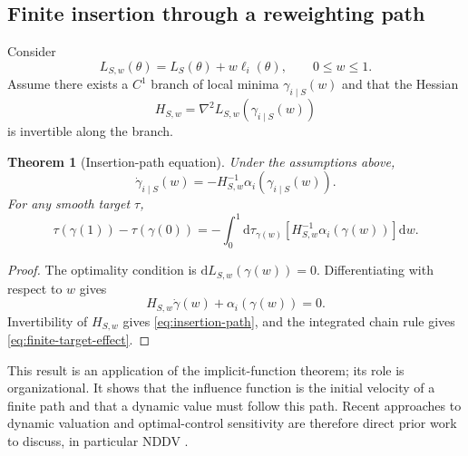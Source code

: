 \documentclass[10pt,a4paper]{article}
\newtheorem{theorem}{Theorem}[section]
\newcommand{\dd}{\mathrm d}
\begin{document}
\subsection{Finite insertion through a reweighting path}
Consider
\begin{equation}
L_{S,w}(\theta)=L_S(\theta)+w\ell_i(\theta),
\qquad 0\leq w\leq1.
\end{equation}
Assume there exists a $C^1$ branch of local minima $\gamma_{i\mid S}(w)$ and that the Hessian
\[
H_{S,w}=\nabla^2L_{S,w}(\gamma_{i\mid S}(w))
\]
is invertible along the branch.

\begin{theorem}[Insertion-path equation]
Under the assumptions above,
\begin{equation}
\boxed{
\dot\gamma_{i\mid S}(w)
=-H_{S,w}^{-1}\alpha_i(\gamma_{i\mid S}(w)).
}
\label{eq:insertion-path}
\end{equation}
For any smooth target $\tau$,
\begin{equation}
\boxed{
\tau(\gamma(1))-\tau(\gamma(0))
=-\int_0^1\dd\tau_{\gamma(w)}
\left[H_{S,w}^{-1}\alpha_i(\gamma(w))\right]\dd w.
}
\label{eq:finite-target-effect}
\end{equation}
\end{theorem}

\begin{proof}
The optimality condition is $\dd L_{S,w}(\gamma(w))=0$. Differentiating with respect to $w$ gives
\[
H_{S,w}\dot\gamma(w)+\alpha_i(\gamma(w))=0.
\]
Invertibility of $H_{S,w}$ gives \eqref{eq:insertion-path}, and the integrated chain rule gives \eqref{eq:finite-target-effect}.
\end{proof}

This result is an application of the implicit-function theorem; its role is organizational. It shows that the influence function is the initial velocity of a finite path and that a dynamic value must follow this path. Recent approaches to dynamic valuation and optimal-control sensitivity are therefore direct prior work to discuss, in particular NDDV \citep{liang2024nddv}.
\end{document}
